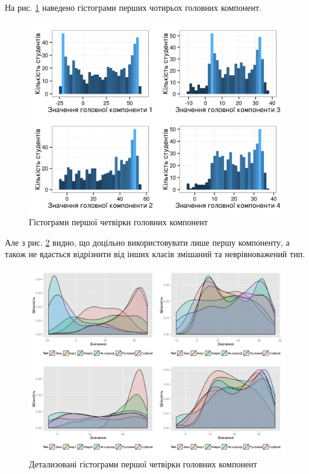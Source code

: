 На рис. \ref{fig:pca:histograms} наведено гістограми перших чотирьох
головних компонент.
\begin{figure}[h]
  \centering
    \includegraphics{images/pca_hists}
  \caption{Гістограми першої четвірки головних компонент}
  \label{fig:pca:histograms}
\end{figure}
Але з рис. \ref{fig:pca:histograms:detailed} видно, що доцільно
використовувати лише першу компоненту, а також не вдасться відрізнити
від інших класів змішаний та неврівноважений тип.
\begin{figure}[h]
  \centering
    \includegraphics[width=\textwidth]{images/pca_hists_detailed}
  \caption{Детализовані гістограми першої четвірки головних компонент}
  \label{fig:pca:histograms:detailed}
\end{figure}


